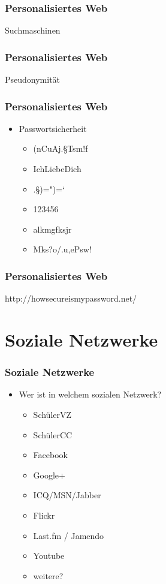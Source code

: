 \documentclass[12pt]{beamer}
\begin{document}
\begin{frame}
  \frametitle{Personalisiertes Web}
  \begin{center} \Large
    Suchmaschinen
  \end{center}
\end{frame}

\begin{frame}
  \frametitle{Personalisiertes Web}
  \begin{center} \Large
     Pseudonymität
  \end{center}
\end{frame}

\begin{frame}
  \frametitle{Personalisiertes Web}
  \begin{itemize}
    \item Passwortsicherheit 
      \begin{itemize}
        \item (nCuAj.§Tsm!f
        \item IchLiebeDich
        \item .§)=")=`
        \item 123456
        \item alkmgfksjr
        \item Mks?o/.u,ePsw!
      \end{itemize}
  \end{itemize}
\end{frame}

\begin{frame}
  \frametitle{Personalisiertes Web}
  \begin{center} \Large
     http://howsecureismypassword.net/
  \end{center}
\end{frame}

\section{Soziale Netzwerke}

\begin{frame}
  \frametitle{Soziale Netzwerke}

  \begin{itemize}
    \item Wer ist in welchem sozialen Netzwerk?
      \begin{itemize}
        \item SchülerVZ
        \item SchülerCC
        \item Facebook
        \item Google+
        \item ICQ/MSN/Jabber
        \item Flickr
        \item Last.fm / Jamendo
        \item Youtube
        \item weitere?
      \end{itemize}
  \end{itemize}
\end{frame}
\end{document}
